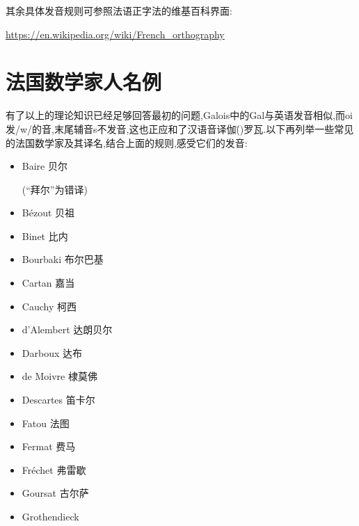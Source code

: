 其余具体发音规则可参照法语正字法的维基百科界面:

\url{https://en.wikipedia.org/wiki/French_orthography}

\section{法国数学家人名例}

有了以上的理论知识已经足够回答最初的问题,Galois中的Gal与英语发音相似,而oi发/w\textscripta/的音,末尾辅音s不发音,这也正应和了汉语音译伽(\textscriptg \=\textscripta)罗瓦.以下再列举一些常见的法国数学家及其译名,结合上面的规则,感受它们的发音:

\begin{multicols}{3}
	\begin{itemize}
		\item Baire 贝尔
		
		(``拜尔''为错译)
		\item Bézout 贝祖
		\item Binet 比内
		\item Bourbaki 布尔巴基
		\item Cartan 嘉当
		\item Cauchy 柯西
		\item d'Alembert 达朗贝尔
		\item Darboux 达布
		\item de Moivre 棣莫佛
		\item Descartes 笛卡尔
		\item Fatou 法图
		\item Fermat 费马
		\item Fréchet 弗雷歇
		\item Goursat 古尔萨
		\item Grothendieck 
		

\end{itemize}
\end{multicols}
